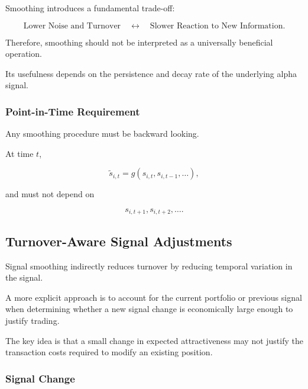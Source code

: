 \documentclass[11pt,a4paper]{article}
\begin{document}
Smoothing introduces a fundamental trade-off:

\begin{equation}
\boxed{
\text{Lower Noise and Turnover}
\quad\longleftrightarrow\quad
\text{Slower Reaction to New Information}.
}
\end{equation}

Therefore, smoothing should not be interpreted as a universally beneficial
operation.

Its usefulness depends on the persistence and decay rate of the underlying
alpha signal.


\subsubsection{Point-in-Time Requirement}

Any smoothing procedure must be backward looking.

At time $t$,

\begin{equation}
\widetilde{s}_{i,t}
=
g
\left(
s_{i,t},
s_{i,t-1},
\ldots
\right),
\end{equation}

and must not depend on

\begin{equation}
s_{i,t+1},
s_{i,t+2},
\ldots.
\end{equation}


\subsection{Turnover-Aware Signal Adjustments}
\label{subsec:turnover_aware_signal_adjustments}

Signal smoothing indirectly reduces turnover by reducing temporal variation in
the signal.

A more explicit approach is to account for the current portfolio or previous
signal when determining whether a new signal change is economically large
enough to justify trading.

The key idea is that a small change in expected attractiveness may not justify
the transaction costs required to modify an existing position.


\subsubsection{Signal Change}
\end{document}
